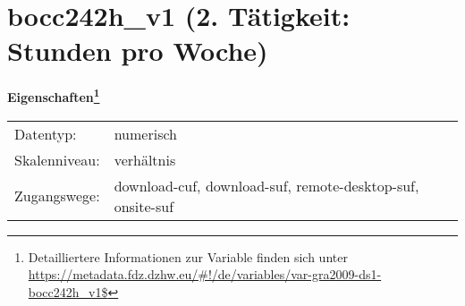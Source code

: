 
    \setcounter{footnote}{0}

    \vspace*{-1.8cm}
	\section{bocc242h\_v1 (2. Tätigkeit: Stunden pro Woche)}
	\label{section:bocc242h_v1}



    \vspace*{0.5cm}
    \noindent\textbf{Eigenschaften\footnote{Detailliertere Informationen zur Variable finden sich unter
		\url{https://metadata.fdz.dzhw.eu/\#!/de/variables/var-gra2009-ds1-bocc242h_v1$}}}\\
	\begin{tabularx}{\hsize}{@{}lX}
	Datentyp: & numerisch \\
	Skalenniveau: & verhältnis \\
	Zugangswege: &
	  download-cuf, 
	  download-suf, 
	  remote-desktop-suf, 
	  onsite-suf
 \\
    \end{tabularx}



